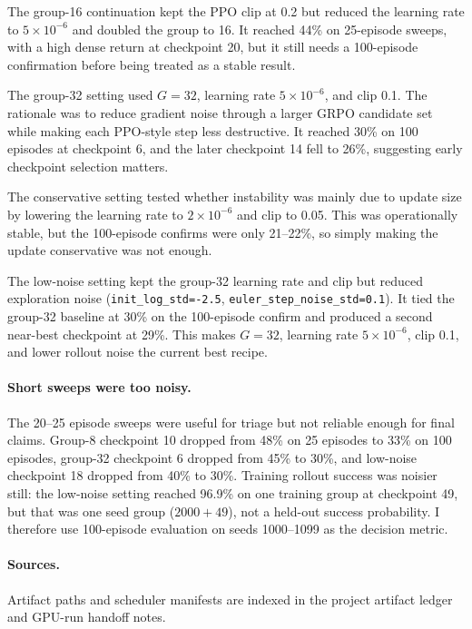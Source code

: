The group-16 continuation kept the PPO clip at 0.2 but reduced the learning rate to $5{\times}10^{-6}$ and doubled the group to 16. It reached 44\% on 25-episode sweeps, with a high dense return at checkpoint 20, but it still needs a 100-episode confirmation before being treated as a stable result.

The group-32 setting used $G=32$, learning rate $5{\times}10^{-6}$, and clip 0.1. The rationale was to reduce gradient noise through a larger GRPO candidate set while making each PPO-style step less destructive. It reached 30\% on 100 episodes at checkpoint 6, and the later checkpoint 14 fell to 26\%, suggesting early checkpoint selection matters.

The conservative setting tested whether instability was mainly due to update size by lowering the learning rate to $2{\times}10^{-6}$ and clip to 0.05. This was operationally stable, but the 100-episode confirms were only 21--22\%, so simply making the update conservative was not enough.

The low-noise setting kept the group-32 learning rate and clip but reduced exploration noise (\texttt{init\_log\_std=-2.5}, \texttt{euler\_step\_noise\_std=0.1}). It tied the group-32 baseline at 30\% on the 100-episode confirm and produced a second near-best checkpoint at 29\%. This makes $G=32$, learning rate $5{\times}10^{-6}$, clip 0.1, and lower rollout noise the current best recipe.

\paragraph{Short sweeps were too noisy.}
The 20--25 episode sweeps were useful for triage but not reliable enough for final claims. Group-8 checkpoint 10 dropped from 48\% on 25 episodes to 33\% on 100 episodes, group-32 checkpoint 6 dropped from 45\% to 30\%, and low-noise checkpoint 18 dropped from 40\% to 30\%. Training rollout success was noisier still: the low-noise setting reached 96.9\% on one training group at checkpoint 49, but that was one seed group ($2000+49$), not a held-out success probability. I therefore use 100-episode evaluation on seeds 1000--1099 as the decision metric.

\paragraph{Sources.}
Artifact paths and scheduler manifests are indexed in the project artifact ledger and GPU-run handoff notes.

